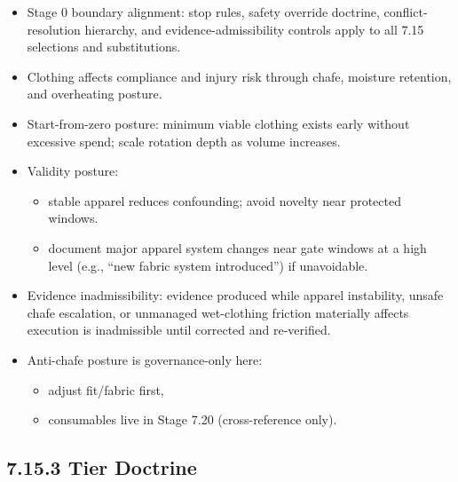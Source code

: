\documentclass[10pt]{article}
\begin{document}
\begin{itemize}
\item Stage 0 boundary alignment: stop rules, safety override doctrine, conflict-resolution hierarchy, and evidence-admissibility controls apply to all 7.15 selections and substitutions.
\item Clothing affects compliance and injury risk through chafe, moisture retention, and overheating posture.
\item Start-from-zero posture: minimum viable clothing exists early without excessive spend; scale rotation depth as volume increases.
\item Validity posture:
  \begin{itemize}
  \item stable apparel reduces confounding; avoid novelty near protected windows.
  \item document major apparel system changes near gate windows at a high level (e.g., “new fabric system introduced”) if unavoidable.
  \end{itemize}
\item Evidence inadmissibility: evidence produced while apparel instability, unsafe chafe escalation, or unmanaged wet-clothing friction materially affects execution is inadmissible until corrected and re-verified.
\item Anti-chafe posture is governance-only here:
  \begin{itemize}
  \item adjust fit/fabric first,
  \item consumables live in Stage 7.20 (cross-reference only).
  \end{itemize}
\end{itemize}

\subsection*{7.15.3 Tier Doctrine}
{}
\end{document}

